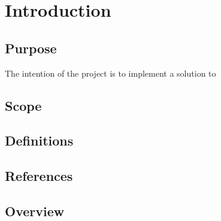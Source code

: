 \section{Introduction}

\subsection{Purpose}
	The intention of the project is to implement a solution to 
\subsection{Scope}

\subsection{Definitions}

\subsection{References}

\subsection{Overview}



